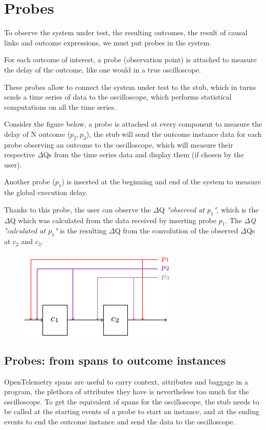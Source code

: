 \section{Probes}

To observe the system under test, the resulting outcomes, the result of causal links and outcome expressions, we must put probes in the system. 

For each outcome of interest, a probe (observation point) is attached to measure the delay of the outcome, like one would in a true oscilloscope. 

These probes allow to connect the system under test to the stub, which in turns sends a time series of data to the oscilloscope, which performs statistical computations on all the time series. 

Consider the figure below, a probe is attached at every component to measure the delay of N outcome ($p_2, p_3$), the stub will send the outcome instance data for each probe observing an outcome to the oscilloscope, which will measure their respective $\Delta$Qs from the time series data and display them (if chosen by the user). 

Another probe ($p_1$) is inserted at the beginning and end of the system to measure the global execution delay. 


Thanks to this probe, the user can observe the $\Delta$Q \textit{"observed at $p_1$"}, which is the $\Delta$Q which was calculated from the data received by inserting probe $p_1$. The \textit{$\Delta$Q "calculated at $p_1$"} is the resulting $\Delta$Q from the convolution of the observed $\Delta$Qs at $c_2$ and $c_3$.   
    \begin{figure}[H]
        \begin{center}
            \includegraphics[scale=1.8]{tikz/probes.pdf}
        \end{center}
    \end{figure}

    \subsection{Probes: from spans to outcome instances}
        OpenTelemetry spans are useful to carry context, attributes and baggage in a program, the plethora of attributes they have is nevertheless too much for the oscilloscope. To get the equivalent of spans for the oscilloscope, the stub needs to be called at the starting events of a probe to start an instance, and at the ending events to end the outcome instance and send the data to the oscilloscope.
